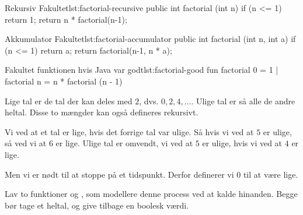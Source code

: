 


	\begin{JavaCode}{Rekursiv Fakultet}{lst:factorial-recursive}
		public int factorial (int n) {
			if (n <= 1)  return 1;
			return n * factorial(n-1);
		}
	\end{JavaCode}

	\begin{JavaCode}{Akkumulator Fakultet}{lst:factorial-accumulator}
		public int factorial (int n, int a) {
			if (n <= 1)  return a;
			return factorial(n-1, n * a);
		}
	\end{JavaCode}

	\begin{JavaCode}{Fakultet funktionen hvis Java var godt}{lst:factorial-good}
		fun factorial 0  =  1
		  | factorial n  =  n * factorial (n - 1)
	\end{JavaCode}

	\begin{exercise}
		Lige tal er de tal der kan deles med \(2\), dvs. \(0, 2, 4, \dots\).
		Ulige tal er så alle de andre heltal. Disse to mængder kan også defineres
		rekursivt.

		Vi ved at et tal er lige, hvis det forrige tal var ulige. Så hvis vi ved
		at \(5\) er ulige, så ved vi at \(6\) er lige. Ulige tal er omvendt, vi
		ved at \(5\) er ulige, hvis vi ved at \(4\) er lige.

		Men vi er nødt til at stoppe på et tidspunkt. Derfor definerer vi
		\(0\) til at være lige.

		Lav to funktioner  og , som modellere
		denne process ved at kalde hinanden. Begge bør tage et heltal, og give
		tilbage en boolesk værdi.


	\end{exercise}

